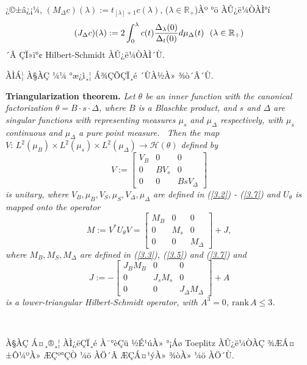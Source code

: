 \documentclass[12pt,a4paper,2sided]{article}
\begin{document}
\newpage{}

\vspace{.8 cm}

\noindent ¿©±â¿¡¼­, $(M_{\Delta}c)(\lambda):= t_{[\lambda]+1}
c(\lambda)$, ($\lambda\in \mathbb R_+$)Àº °ö ÀÛ¿ë¼ÒÀÌ°í
$$
(J_{\Delta}\label{Jdelta} c)(\lambda) := 2 \int _{0}^{\lambda}c(t)
\frac{\Delta_{\lambda}(0)}{\Delta_{t}(0)} d\mu_{\Delta}(t) \ \
\hbox{($\lambda \in \mathbb R_+$)}
$$
´Â ÇÏ»ï°¢ Hilbert-Schmidt ÀÛ¿ë¼ÒÀÌ´Ù. \

\medskip

ÀÌÁ¦ À§ÀÇ ¼¼ °æ¿ì¸¦ Á¾ÇÕÇÏ¸é ´ÙÀ½À» ¾ò´Â´Ù.

\medskip

{\bf Triangularization theorem.} \cite [p.123] {Ni} {\sl Let
$\theta$ be an inner function with the canonical factorization
$\theta=B\cdot s \cdot \Delta$, where $B$ is a Blaschke product,
and $s$ and $\Delta$ are singular functions with representing
measures $\mu_{s}$ and $\mu_{\Delta}$ respectively, with $\mu_{s}$
continuous and $\mu_{\Delta}$ a pure point measure. \  Then the
map $V:\,L^2(\mu_B)\times L^2(\mu_s) \times L^2(\mu_{\Delta})\to
\mathcal H(\theta)$ defined by
\begin{equation}\label{3.8}
V:=\begin{bmatrix}V_B&0&0\\0&BV_s&0\\0&0&BsV_{\Delta}\end{bmatrix}
\end{equation}
is unitary, where $V_B, \mu_B, V_S, \mu_S, V_\Delta, \mu_\Delta$ are
defined in (\ref{3.2}) - (\ref{3.7}) and $U_\theta$ is mapped onto
the operator
$$
M:= V^*U_\theta V =
\begin{bmatrix}M_B&0&0\\0&M_{s}&0\\0&0&M_{\Delta}\end{bmatrix}+J,
$$
where $M_B, M_S, M_{\Delta}$ are defined in (\ref{3.3}), (\ref{3.5})
and (\ref{3.7}) and
$$
J:=-\begin{bmatrix}J_BM_B&0&0\\0&J_sM_s&0\\0&0&J_{\Delta}M_\Delta\end{bmatrix}+A
$$
is a lower-triangular Hilbert-Schmidt operator, with $A^3=0$,
$\text{rank}\,A\leq 3$.}

\

À§ÀÇ Á¤¸®¸¦ ÀÌ¿ëÇÏ¸é À¯°èÇü ½É¹úÀ» °¡Áø Toeplitz ÀÛ¿ë¼ÒÀÇ ¾ÆÁ¤±Ô¼ºÀ»
ÆÇº°ÇÒ ¼ö ÀÖ´Â ÆÇÁ¤¹ýÀ» ¾òÀ» ¼ö ÀÖ´Ù.
\end{document}
